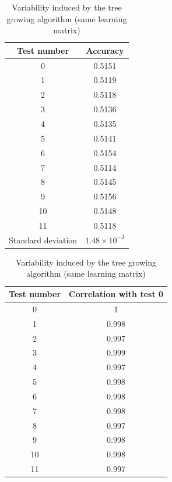 \documentclass[a4paper]{report}
\begin{document}
		\begin{table}
			\centering
			\begin{subtable}{0.5\textwidth}
				\begin{tabular}{c|c}
				\hline
				Test number & Accuracy \\
				\hline \hline
				0 & 0.5151 \\
				1 & 0.5119 \\
				2 & 0.5118 \\
				3 & 0.5136 \\
				4 & 0.5135 \\
				5 & 0.5141 \\
				6 & 0.5154 \\
				7 & 0.5114 \\
				8 & 0.5145 \\
				9 & 0.5156 \\
				10 & 0.5148 \\
				11 & 0.5118 \\
				\hline
				Standard deviation & $1.48 \times 10^{-3} $ \\
				\hline
				\end{tabular}
				\caption{\label{tab:AccVarTrees}Accuracy variability}
			\end{subtable}%
			\begin{subtable}{0.5\textwidth}
				\begin{tabular}{c|c}
				\hline
				Test number & Correlation with test 0\\
				\hline \hline
				0 & 1\\
				1 & 0.998 \\
				2 & 0.997 \\
				3 & 0.999 \\
				4 & 0.997 \\
				5 & 0.998 \\
				6 & 0.998 \\
				7 & 0.998 \\
				8 & 0.997 \\
				9 & 0.998 \\
				10 & 0.998 \\
				11 & 0.997 \\
				\hline
				\end{tabular}
				\caption{\label{tab:CorrMatFiltTreeVar}Correlation vector of the filter importances with test number 0}
			\end{subtable}
			\caption{\label{tab:TreeVar}Variability induced by the tree growing algorithm (same learning matrix)}
		\end{table}
		
\end{document}
